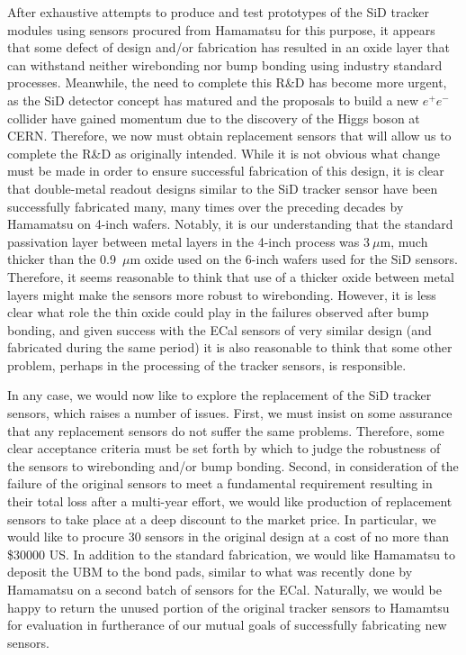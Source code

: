 \documentclass[prc,12pt,nofootinbib,letterpaper]{revtex4}
\begin{document}
After exhaustive attempts to produce and test prototypes of the SiD tracker modules using  sensors procured from Hamamatsu for this purpose, it appears that some defect of design and/or fabrication has resulted in an oxide layer that can withstand neither wirebonding nor bump bonding using industry standard processes.  Meanwhile, the need to complete this R\&D has become more urgent, as the SiD detector concept has matured and the proposals to build a new $e^+e^-$ collider have gained momentum due to the discovery of the Higgs boson at CERN.  Therefore, we now must obtain replacement sensors that will allow us to complete the R\&D as originally intended.  While it is not obvious what change must be made in order to ensure successful fabrication of this design, it is clear that double-metal readout designs similar to the SiD tracker sensor have been successfully fabricated many, many times over the preceding decades by Hamamatsu on 4-inch wafers. Notably, it is our understanding that the standard passivation layer between metal layers in the 4-inch process was 3$~\mu$m, much thicker than the 0.9~$\mu$m oxide used on the 6-inch wafers used for the SiD sensors.    Therefore, it seems reasonable to think that use of a thicker oxide between metal layers might make the sensors more robust to wirebonding.  However, it is less clear what role the thin oxide could play in the failures observed after bump bonding, and given success with the ECal sensors of very similar design (and fabricated during the same period) it is also reasonable to think that some other problem, perhaps in the processing of the tracker sensors, is responsible.

In any case, we would now like to explore the replacement of the SiD tracker sensors, which raises a number of issues.  First, we must insist on some assurance that any replacement sensors do not suffer the same problems. Therefore, some clear acceptance criteria must be set forth by which to judge the robustness of the sensors to wirebonding and/or bump bonding.  Second, in consideration of the failure of the original sensors to meet a fundamental requirement resulting in their total loss after a multi-year effort, we would like production of replacement sensors to take place at a deep discount to the market price.  In particular, we would like to procure 30 sensors in the original design at a cost of no more than \$30000 US. In addition to the standard fabrication, we would like Hamamatsu to deposit the UBM to the bond pads, similar to what was recently done by Hamamatsu on a second batch of sensors for the ECal. Naturally, we would be happy to return the unused portion of the original tracker sensors to Hamamtsu for evaluation in furtherance of our mutual goals of successfully fabricating new sensors.
\end{document}
